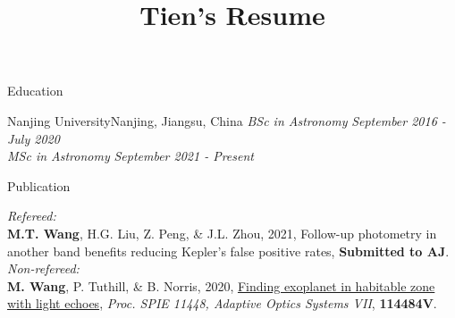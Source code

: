 \documentclass{resume} %
\newcommand{\doi}[2]{\href{http://doi.org/#1}{{#2}}}
\begin{document}
\title{Tien's Resume}

\begin{rSection}{Education}

    \begin{rSubsection}{Nanjing University}{Nanjing, Jiangsu, China}{}{}
    {\em BSc in Astronomy } \hfill {\em September 2016 - July 2020} \\
    {\em MSc in Astronomy} \hfill {\em September 2021 - Present} 
\end{rSubsection}
\end{rSection}


\begin{rSection}{Publication}

{\em Refereed:}\\
\textbf{M.T. Wang}, H.G. Liu, Z. Peng, \& J.L. Zhou, 2021,
 Follow-up photometry in another band benefits reducing Kepler’s false positive rates,
\textbf{Submitted to AJ}.
\vspace{0.6cm}
\\
{\em Non-refereed:}\\
\textbf{M. Wang}, P. Tuthill, \& B. Norris, 2020,
\doi{10.1117/12.2559345}{Finding exoplanet in habitable zone with light echoes},
\textit{Proc. SPIE 11448, Adaptive Optics Systems VII}, \textbf{114484V}.


\end{rSection}

%
%
\end{document}
